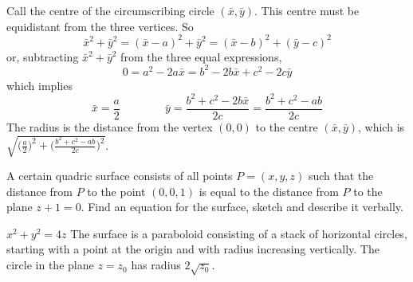 \begin{solution}
Call the centre of the circumscribing circle 
$(\bar x,\bar y)$. This centre must be equidistant from the three vertices.
So
\begin{equation*}
\bar x^2+\bar y^2=(\bar x-a)^2+\bar y^2=(\bar x-b)^2+(\bar y-c)^2 
\end{equation*}
or, subtracting $\bar x^2+\bar y^2$ from the three equal expressions,
\begin{equation*}
0=a^2-2a\bar x=b^2-2b\bar x+c^2-2c\bar y
\end{equation*}
which implies
\begin{equation*}
\bar x=\frac{a}{2}\qquad\qquad \bar y
=\frac{b^2+c^2-2b\bar x}{2c}=\frac{b^2+c^2-ab}{2c}
\end{equation*}
The radius is the distance from the vertex $(0,0)$ to the centre 
$(\bar x,\bar y)$, which is
$\sqrt{\big(\frac{a}{2}\big)^2+\big(\frac{b^2+c^2-ab}{2c}\big)^2}$.

\end{solution}

\begin{question} [M200 2001A] %
A certain quadric surface consists of all points $P=(x,y,z)$
such that the distance from $P$ to the point $(0,0,1)$ is equal to the
distance from $P$ to the plane $z+1=0$. Find an equation for the surface,
sketch and describe it verbally.
\end{question}

%

\begin{answer}
$x^2+y^2=4z$
The surface is a paraboloid consisting of a stack of horizontal circles, starting with a point at the origin and with radius increasing vertically.
The circle in the plane $z=z_0$ has radius $2\sqrt{z_0}$.
\end{answer}

